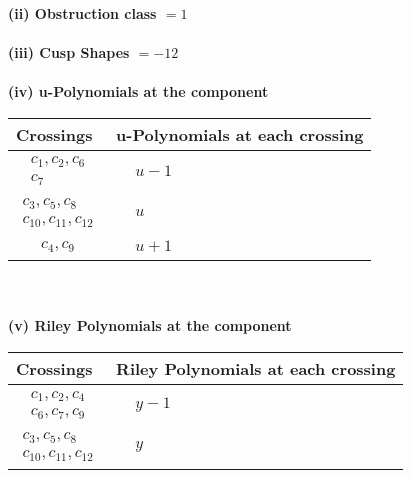 \documentclass[1p]{elsarticle_modified}
\theoremstyle{definition}
\begin{document}
\flushleft \textbf{(ii) Obstruction class $= 1$}\\~\\
\flushleft \textbf{(iii) Cusp Shapes $= -12$}\\~\\
\newpage\renewcommand{\arraystretch}{1}
\flushleft \textbf{(iv) u-Polynomials at the component}\newline \\
\begin{tabular}{m{50pt}|m{274pt}}
Crossings & \hspace{64pt}u-Polynomials at each crossing \\
\hline $$\begin{aligned}c_{1},c_{2},c_{6}\\c_{7}\end{aligned}$$&$\begin{aligned}
&u-1
\end{aligned}$\\
\hline $$\begin{aligned}c_{3},c_{5},c_{8}\\c_{10},c_{11},c_{12}\end{aligned}$$&$\begin{aligned}
&u
\end{aligned}$\\
\hline $$\begin{aligned}c_{4},c_{9}\end{aligned}$$&$\begin{aligned}
&u+1
\end{aligned}$\\
\hline
\end{tabular}\\~\\
\newpage\renewcommand{\arraystretch}{1}
\flushleft \textbf{(v) Riley Polynomials at the component}\newline \\
\begin{tabular}{m{50pt}|m{274pt}}
Crossings & \hspace{64pt}Riley Polynomials at each crossing \\
\hline $$\begin{aligned}c_{1},c_{2},c_{4}\\c_{6},c_{7},c_{9}\end{aligned}$$&$\begin{aligned}
&y-1
\end{aligned}$\\
\hline $$\begin{aligned}c_{3},c_{5},c_{8}\\c_{10},c_{11},c_{12}\end{aligned}$$&$\begin{aligned}
&y
\end{aligned}$\\
\hline
\end{tabular}\\~\\
\end{document}
